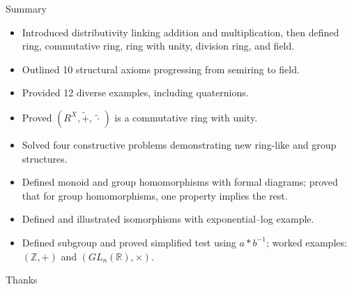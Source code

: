 \begin{frame}{Summary}
\vspace{-0.3cm}
\begin{itemize}
  \item Introduced distributivity linking addition and multiplication, then defined ring, commutative ring, ring with unity, division ring, and field.
\item Outlined 10 structural axioms progressing from semiring to field.
\item Provided 12 diverse examples, including quaternions.
\item Proved $(R^X,\tilde{+},\, \tilde{\cdot}\, )$ is a commutative ring with unity.
\item Solved four constructive problems demonstrating new ring-like and group structures.
\item Defined monoid and group homomorphisms with formal diagrams; proved that for group homomorphisms, one property implies the rest.
\item Defined and illustrated isomorphisms with exponential–log example.
\item Defined subgroup and proved simplified test using \(a*b^{-1}\); worked examples: $(\mathbb{Z},+)$ and $(GL_n(\mathbb{R}),\times)$.
\end{itemize}
\end{frame}

\begin{frame}{Thanks}
  \cmcendframe
\end{frame}



